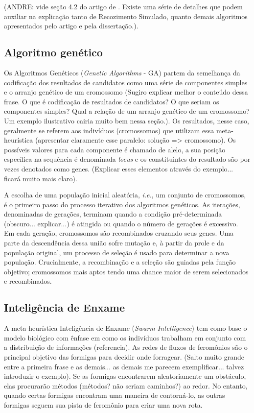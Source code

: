(ANDRE: vide seção 4.2 do artigo de \cite{youssef2001167}. Existe uma série de detalhes que podem auxiliar na explicação tanto de Recozimento Simulado, quanto demais algoritmos apresentados pelo artigo e pela dissertação.).


\subsection{Algoritmo genético}

Os Algoritmos Genéticos (\textit{Genetic Algorithms} - GA) partem da semelhança da codificação dos resultados de candidatos como uma série de componentes simples e o arranjo genético de um cromossomo \cite{alander1998genetic} (Sugiro explicar melhor o conteúdo dessa frase. O que é codificação de resultados de candidatos? O que seriam os componentes simples? Qual a relação de um arranjo genético de um cromossomo? Um exemplo ilustrativo cairia muito bem nessa seção.). Os resultados, nesse caso, geralmente se referem aos indivíduos (cromossomos) que utilizam essa meta-heurística (apresentar claramente esse paralelo: solução => cromossomo). Os possíveis valores para cada componente é chamado de alelo, a sua posição específica na sequência é denominada \textit{locus} e os constituintes do resultado são por vezes denotados como genes. (Explicar esses elementos através do exemplo... ficará muito mais claro).

A escolha de uma população inicial aleatória, \textit{i.e.}, um conjunto de cromossomos, é o primeiro passo do processo iterativo dos algoritmos genéticos.  As iterações, denominadas de gerações, terminam quando a condição pré-determinada (obscuro... explicar...) é atingida ou quando o número de gerações é excessivo. Em cada geração, cromossomos são recombinados cruzando seus genes. Uma parte da descendência dessa união sofre mutação e, à partir da prole e da população original, um processo de seleção é usado para determinar a nova população.  Crucialmente, a recombinação e a seleção são guiadas pela função objetivo; cromossomos mais aptos tendo uma chance maior de serem selecionados e recombinados.




\subsection{Inteligência de Enxame}

A meta-heurística Inteligência de Enxame (\textit{Swarm Intelligence}) tem como base o modelo biológico com ênfase em como os indivíduos trabalham em conjunto com a distribuição de informações (referencia). As redes de fluxos de feromônios são o principal objetivo das formigas para decidir onde forragear. (Salto muito grande entre a primeira frase e as demais... as demais me parecem exemplificar...  talvez introduzir o exemplo). Se as formigas encontrarem aleatoriamente um obstáculo, elas procurarão métodos (métodos? não seriam caminhos?) ao redor. No entanto, quando certas formigas encontram uma maneira de contorná-lo, as outras formigas seguem sua pista de feromônio para criar uma nova rota.

